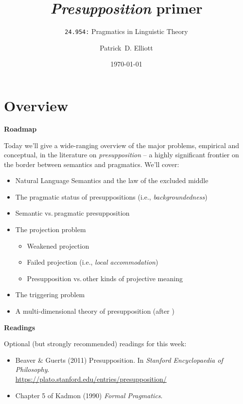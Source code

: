 \documentclass[cronos,landscape,paper=letter]{ling-handout}
\title{\textit{Presupposition} primer}
\subtitle{\texttt{24.954:} Pragmatics in Linguistic Theory}
\date{\today}
\author{Patrick~D. Elliott}
\begin{document}
\maketitle

\section{Overview}

\textbf{Roadmap}

Today we'll give a wide-ranging overview of the major problems, empirical and conceptual, in the literature on \textit{presupposition} -- a highly significant frontier on the border between semantics and pragmatics. We'll cover:

\begin{itemize}

    \item Natural Language Semantics and the law of the excluded middle

    \item The pragmatic status of presuppositions (i.e., \textit{backgroundedness})

    \item Semantic vs.\,pragmatic presupposition

  \item The projection problem

    \begin{itemize}

      \item Weakened projection

        \item Failed projection (i.e., \textit{local accommodation})

        \item Presupposition vs.\,other kinds of projective meaning

    \end{itemize}

  \item The triggering problem

  \item A multi-dimensional theory of presupposition (after \citealt{karttunenPeters1979})

\end{itemize}

\textbf{Readings}

Optional (but strongly recommended) readings for this week:

\begin{itemize}

  \item Beaver \& Guerts (2011) Presupposition. In \textit{Stanford Encyclopaedia of Philosophy}.\\
    \url{https://plato.stanford.edu/entries/presupposition/}

  \item Chapter 5 of Kadmon (1990) \textit{Formal Pragmatics}.

\end{itemize}
\end{document}
